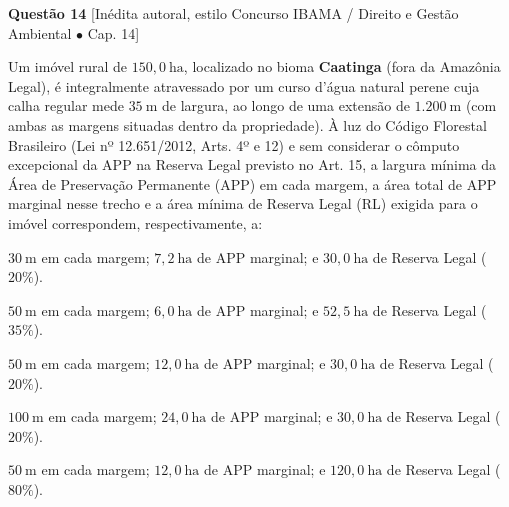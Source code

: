 \vspace{6pt}
\noindent\textbf{Questão 14} {\footnotesize\color{uefsMuted}[Inédita autoral, estilo Concurso IBAMA / Direito e Gestão Ambiental $\bullet$ Cap. 14]}\par
Um imóvel rural de $150,0\ \text{ha}$, localizado no bioma \textbf{Caatinga} (fora da Amazônia Legal), é integralmente atravessado por um curso d'água natural perene cuja calha regular mede $35\ \text{m}$ de largura, ao longo de uma extensão de $1.200\ \text{m}$ (com ambas as margens situadas dentro da propriedade). À luz do Código Florestal Brasileiro (Lei nº 12.651/2012, Arts. 4º e 12) e sem considerar o cômputo excepcional da APP na Reserva Legal previsto no Art. 15, a largura mínima da Área de Preservação Permanente (APP) em cada margem, a área total de APP marginal nesse trecho e a área mínima de Reserva Legal (RL) exigida para o imóvel correspondem, respectivamente, a:
\begin{alternativas}
  \item $30\ \text{m}$ em cada margem; $7,2\ \text{ha}$ de APP marginal; e $30,0\ \text{ha}$ de Reserva Legal ($20\%$).
  \item $50\ \text{m}$ em cada margem; $6,0\ \text{ha}$ de APP marginal; e $52,5\ \text{ha}$ de Reserva Legal ($35\%$).
  \item $50\ \text{m}$ em cada margem; $12,0\ \text{ha}$ de APP marginal; e $30,0\ \text{ha}$ de Reserva Legal ($20\%$).
  \item $100\ \text{m}$ em cada margem; $24,0\ \text{ha}$ de APP marginal; e $30,0\ \text{ha}$ de Reserva Legal ($20\%$).
  \item $50\ \text{m}$ em cada margem; $12,0\ \text{ha}$ de APP marginal; e $120,0\ \text{ha}$ de Reserva Legal ($80\%$).
\end{alternativas}

